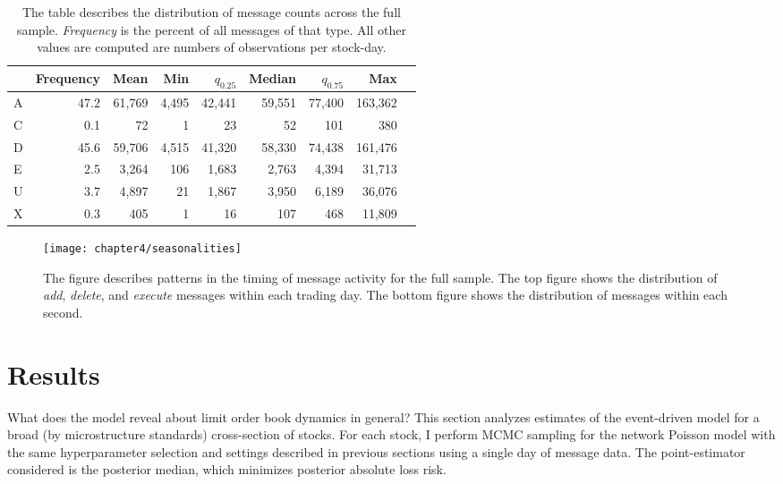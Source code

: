 	\begin{table}[t]
		\small
		\linespread{1}
		\centering
		\captionsetup{position=below, font=footnotesize, justification=justified, width=\linewidth}
		\caption[Message counts]{The table describes the distribution of message counts across the full sample. \textit{Frequency} is the percent of all messages of that type. All other values are computed are numbers of observations per stock-day.}
		\label{tab:message_counts}
		\begin{tabular*}{\textwidth}{@{\extracolsep{\fill}}lrrrrrrrr}
			\toprule{}
			 &  Frequency  &   Mean  & Min &  $q_{0.25}$ &  Median &    $q_{0.75}$   &        Max \\
			\midrule
			A &  47.2  &  61,769 &  4,495 &  42,441 &  59,551 &  77,400 &  163,362 \\
			C &  0.1   &      72 &     1  &      23 &      52 &     101 &      380 \\
			D &  45.6  &  59,706 &  4,515 &  41,320 &  58,330 &  74,438 &  161,476 \\
			E &  2.5   &   3,264 &   106  &   1,683 &   2,763 &   4,394 &   31,713 \\
			U &  3.7   &   4,897 &     21 &   1,867 &   3,950 &   6,189 &   36,076 \\
			X &  0.3   &     405 &      1 &      16 &     107 &     468 &   11,809 \\
			\bottomrule
		\end{tabular*}
	\end{table}

	\begin{figure}[t]
		\small
		\linespread{1}
		\centering
		\texttt{[image: chapter4/seasonalities]}
		\captionsetup{skip=-20pt, labelsep=colon, font=footnotesize, width=\linewidth, justification=justified}
		\caption[Message activity seasonalities]{The figure describes patterns in the timing of message activity for the full sample. The top figure shows the distribution of \textit{add}, \textit{delete}, and \textit{execute} messages within each trading day. The bottom figure shows the distribution of messages within each second.}
		\label{fig:seasonalities}
	\end{figure}


\section{Results}
	What does the model reveal about limit order book dynamics in general? This section analyzes estimates of the event-driven model for a broad (by microstructure standards) cross-section of stocks. For each stock, I perform MCMC sampling for the network Poisson model with the same hyperparameter selection and settings described in previous sections using a single day of message data. The point-estimator considered is the posterior median, which minimizes posterior absolute loss risk.

